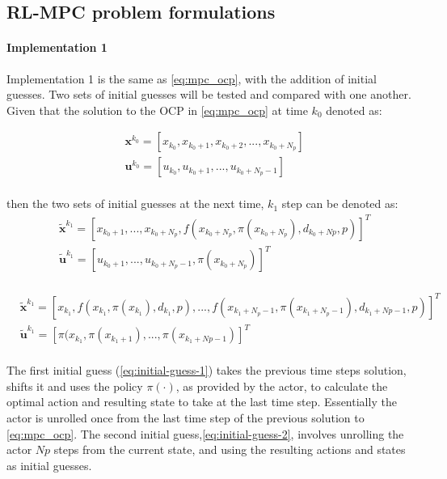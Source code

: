 \subsection{RL-MPC problem formulations}

\paragraph{Implementation 1}
Implementation 1 is the same as \autoref{eq:mpc_ocp}, with the addition of initial guesses. Two sets of initial guesses will be tested and compared with one another. Given that the solution to the OCP in \autoref{eq:mpc_ocp} at time $k_0$ denoted as:


\begin{equation}\label{eq:sol-mpc-ocp}
	\begin{aligned}
		&\mathbf{x}^{k_0} = [x_{k_0},x_{k_0 + 1},x_{k_0 + 2}, ...,x_{k_0 + N_p}] \\ 
		&\mathbf{u}^{k_0} = [u_{k_0},u_{k_0 + 1}, ...,u_{k_0 + N_p-1}] \\
	\end{aligned}
\end{equation}

then the two sets of initial guesses at the next time, $k_1$ step can be denoted as:
\begin{equation}\label{eq:initial-guess-1}
	\begin{aligned}
		&\tilde{\mathbf{x}}^{k_1} = [x_{k_0 + 1},...,x_{k_0 + N_p}, f(x_{k_0 + N_p}, \pi(x_{k_0 + N_p}), d_{k_0 + Np},p)]^T \\ 
		&\tilde{\mathbf{u}}^{k_1} = [u_{k_0 + 1},...,u_{k_0 + N_p - 1}, \pi(x_{k_0 + N_p})]^T \\ 
	\end{aligned}
\end{equation}

\begin{equation}\label{eq:initial-guess-2}
	\begin{aligned}
	&\tilde{\mathbf{x}}^{k_1} = [x_{k_1},f(x_{k_1},\pi(x_{k_1}),d_{k_1},p),..., f(x_{k_1 + N_p-1}, \pi(x_{k_1 + N_p-1}), d_{k_1 + Np-1},p)]^T \\ 
	&\tilde{\mathbf{u}}^{k_1} = [\pi(x_{k_1},\pi(x_{k_1+1}),...,\pi(x_{k_1+Np-1})]^T \\ 
\end{aligned}
\end{equation}

The first initial guess (\autoref{eq:initial-guess-1}) takes the previous time steps solution, shifts it and uses the policy $\pi(\cdot)$, as provided by the actor, to calculate the optimal action and resulting state to take at the last time step. Essentially the actor is unrolled once from the last time step of the previous solution to \autoref{eq:mpc_ocp}. The second initial guess,\autoref{eq:initial-guess-2}, involves unrolling the actor $Np$ steps from the current state, and using the resulting actions and states as initial guesses. 

